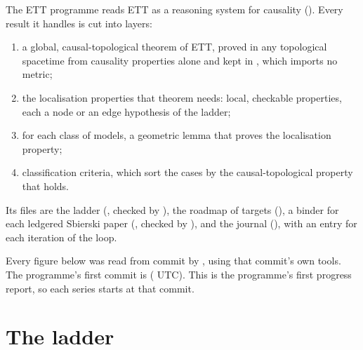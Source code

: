 The ETT programme reads ETT as a reasoning system for causality ().
Every result it handles is cut into layers:
\begin{enumerate}
\item a global, causal-topological theorem of ETT, proved in any topological spacetime from
  causality properties alone and kept in , which imports no metric;
\item the localisation properties that theorem needs: local, checkable properties, each a node or
  an edge hypothesis of the ladder;
\item for each class of models, a geometric lemma that proves the localisation property;
\item classification criteria, which sort the cases by the causal-topological property that holds.
\end{enumerate}
Its files are the ladder (, checked by ), the
roadmap of targets (), a binder for each ledgered Sbierski paper
(, checked by ), and the journal
(), with an entry for each iteration of the loop.

Every figure below was read from commit \texttt{\progRev} by ,
using that commit's own tools. The programme's first commit is \texttt{\progStartRev}
(\progStartTime{} UTC). This is the programme's first progress report, so each series starts at
that commit.

\section{The ladder}\label{sec:ladder}

